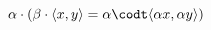 \documentclass[preview]{standalone}
\begin{document}
\begin{center}
$\alpha \cdot (\beta \cdot \langle x, y \rangle = \alpha \codt \langle \alpha x, \alpha y \rangle)$
\end{center}
\end{document}

